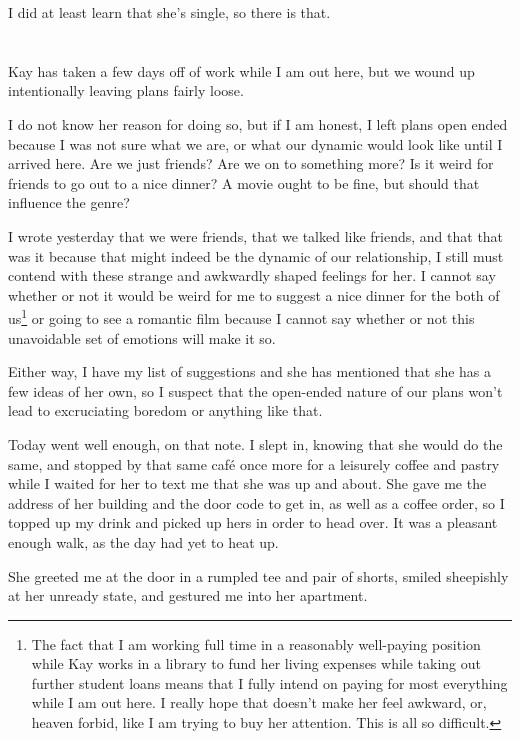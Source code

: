 I did at least learn that she's single, so there is that.

\section{}

Kay has taken a few days off of work while I am out here, but we wound up intentionally leaving plans fairly loose.

I do not know her reason for doing so, but if I am honest, I left plans open ended because I was not sure what we are, or what our dynamic would look like until I arrived here. Are we just friends? Are we on to something more? Is it weird for friends to go out to a nice dinner? A movie ought to be fine, but should that influence the genre?

I wrote yesterday that we were friends, that we talked like friends, and that that was it because that might indeed be the dynamic of our relationship, I still must contend with these strange and awkwardly shaped feelings for her. I cannot say whether or not it would be weird for me to suggest a nice dinner for the both of us\footnote{The fact that I am working full time in a reasonably well-paying position while Kay works in a library to fund her living expenses while taking out further student loans means that I fully intend on paying for most everything while I am out here. I really hope that doesn't make her feel awkward, or, heaven forbid, like I am trying to buy her attention. This is all so difficult.} or going to see a romantic film because I cannot say whether or not this unavoidable set of emotions will make it so.

Either way, I have my list of suggestions and she has mentioned that she has a few ideas of her own, so I suspect that the open-ended nature of our plans won't lead to excruciating boredom or anything like that.

Today went well enough, on that note. I slept in, knowing that she would do the same, and stopped by that same café once more for a leisurely coffee and pastry while I waited for her to text me that she was up and about. She gave me the address of her building and the door code to get in, as well as a coffee order, so I topped up my drink and picked up hers in order to head over. It was a pleasant enough walk, as the day had yet to heat up.

She greeted me at the door in a rumpled tee and pair of shorts, smiled sheepishly at her unready state, and gestured me into her apartment.

